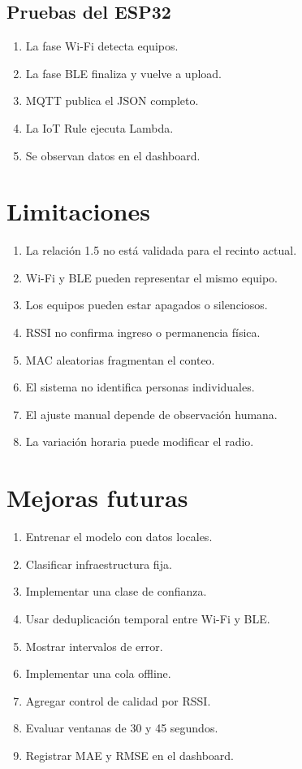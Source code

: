 \documentclass[12pt,a4paper]{article}
\begin{document}
\subsection{Pruebas del ESP32}
\begin{enumerate}
\item La fase Wi-Fi detecta equipos.
\item La fase BLE finaliza y vuelve a upload.
\item MQTT publica el JSON completo.
\item La IoT Rule ejecuta Lambda.
\item Se observan datos en el dashboard.
\end{enumerate}

\section{Limitaciones}
\begin{enumerate}
\item La relación 1.5 no está validada para el recinto actual.
\item Wi-Fi y BLE pueden representar el mismo equipo.
\item Los equipos pueden estar apagados o silenciosos.
\item RSSI no confirma ingreso o permanencia física.
\item MAC aleatorias fragmentan el conteo.
\item El sistema no identifica personas individuales.
\item El ajuste manual depende de observación humana.
\item La variación horaria puede modificar el radio.
\end{enumerate}

\section{Mejoras futuras}
\begin{enumerate}
\item Entrenar el modelo con datos locales.
\item Clasificar infraestructura fija.
\item Implementar una clase de confianza.
\item Usar deduplicación temporal entre Wi-Fi y BLE.
\item Mostrar intervalos de error.
\item Implementar una cola offline.
\item Agregar control de calidad por RSSI.
\item Evaluar ventanas de 30 y 45 segundos.
\item Registrar MAE y RMSE en el dashboard.
\end{enumerate}
\end{document}

